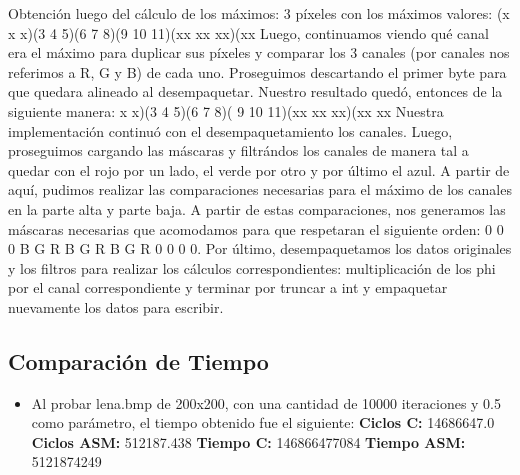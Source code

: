 \documentclass[10pt, a4paper]{article}
\begin{document}
\begin{itemize}
Obtención luego del cálculo de los máximos: 3 píxeles con los máximos valores:\newline
		(x x x)(3 4 5)(6  7  8)(9 10 11)(xx xx xx)(xx\newline
\newline
Luego, continuamos viendo qué canal era el máximo para duplicar sus píxeles y comparar los 3 canales (por canales nos referimos a R, G y B) de cada uno. Proseguimos descartando el primer byte para que quedara alineado al desempaquetar. Nuestro resultado quedó, entonces de la siguiente manera:\newline
		x x)(3 4 5)(6  7  8)( 9 10 11)(xx xx xx)(xx xx\newline
		\newline
Nuestra implementación continuó con el desempaquetamiento los canales. Luego, proseguimos cargando las máscaras y filtrándos los canales de manera tal a quedar con el rojo por un lado, el verde por otro y por último el azul. A partir de aquí, pudimos realizar las comparaciones necesarias para el máximo de los canales en la parte alta y parte baja. A partir de estas comparaciones, nos generamos las máscaras necesarias que acomodamos para que respetaran el siguiente orden: 0 0 0 B G R B G R B G R 0 0 0 0.\newline
Por último, desempaquetamos los datos originales y los filtros para realizar los cálculos correspondientes: multiplicación de los phi por el canal correspondiente y terminar por truncar a int y empaquetar nuevamente los datos para escribir.
\subsection{Comparación de Tiempo}

\begin{itemize}
\item{Al probar lena.bmp de 200x200, con una cantidad de 10000 iteraciones y 0.5 como parámetro, el tiempo obtenido fue el siguiente:\newline
\newline
\textbf{Ciclos C:}                 14686647.0\newline
\vspace{0.15cm}
\textbf{Ciclos ASM:}               512187.438\newline
\textbf{Tiempo C:}                  146866477084\newline
\textbf{Tiempo ASM:}               5121874249\newline}


\end{itemize}
\end{itemize}
\end{document}
